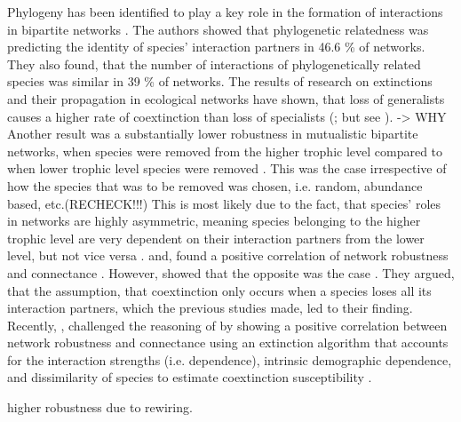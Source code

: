 \documentclass[12pt,a4paper]{article}
\begin{document}
Phylogeny has been identified to play a key role in the formation of interactions in bipartite networks \parencite{Rezende2007}. The authors showed that phylogenetic relatedness was predicting the identity of species' interaction partners in 46.6 \% of networks. They also found, that the number of interactions of phylogenetically related species was similar in 39 \% of networks.
The results of research on extinctions and their propagation in ecological networks have shown, that loss of generalists causes a higher rate of coextinction than loss of specialists (\cite{Memmott2004, Kaiser-Bunbury2010, Traveset2017, Bastazini2018, Vizentin-Bugoni2019, Biella2020}; but see \cite{Dunne2002}). 
-> WHY
Another result was a substantially lower robustness in mutualistic bipartite networks, when species were removed from the higher trophic level compared to when lower trophic level species were removed \parencite{Schleuning2016, Traveset2017}. This was the case irrespective of how the species that was to be removed was chosen, i.e. random, abundance based, etc.(RECHECK!!!) This is most likely due to the fact, that species' roles in networks are highly asymmetric, meaning species belonging to the higher trophic level are very dependent on their interaction partners from the lower level, but not vice versa \parencite{Bascompte2006}. 
\citeauthor{Dunne2002, Ekloef2006} and, \citeauthor{Thebault2010} found a positive correlation of network robustness and connectance \parencite{Dunne2002, Ekloef2006, Thebault2010}. However, \citeauthor{Vieira2015} showed that the opposite was the case \parencite{Vieira2015}. They argued, that the assumption, that coextinction only occurs when a species loses all its interaction partners, which the previous studies made, led to their finding. Recently, \citeauthor{Baumgartner2020}, challenged the reasoning of \citeauthor{Vieira2015} by showing a positive correlation between network robustness and connectance using an extinction algorithm that accounts for the interaction strengths (i.e. dependence), intrinsic demographic dependence, and dissimilarity of species to estimate coextinction susceptibility \parencite{Baumgartner2020}. 


\parencite{Kaiser-Bunbury2010, Schleuning2016, Timoteo2016, Costa2018} higher robustness due to rewiring. %
\end{document}
